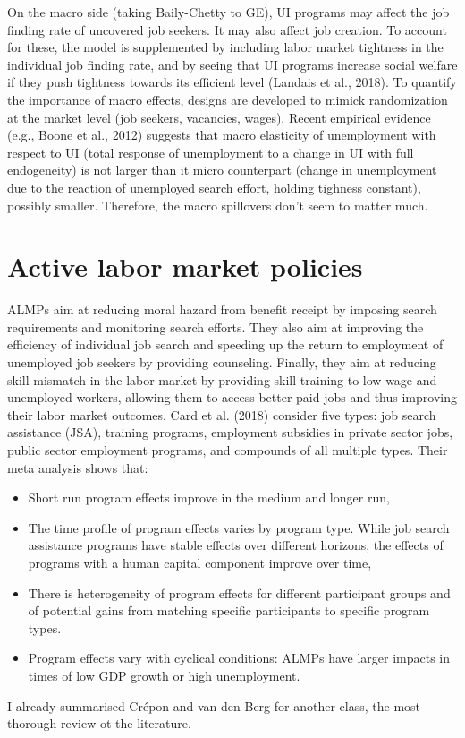 \documentclass{article}
\begin{document}
On the macro side (taking Baily-Chetty to GE), UI programs may affect the job finding rate of uncovered job seekers. It may also affect job creation. To account for these, the model is supplemented by including labor market tightness in the individual job finding rate, and by seeing that UI programs increase social welfare if they push tightness towards its efficient level (Landais et al., 2018). To quantify the importance of macro effects, designs are developed to mimick randomization at the market level (job seekers, vacancies, wages). Recent empirical evidence (e.g., Boone et al., 2012) suggests that macro elasticity of unemployment with respect to UI (total response of unemployment to a change in UI with full endogeneity) is not larger than it micro counterpart (change in unemployment due to the reaction of unemployed search effort, holding tighness constant), possibly smaller. Therefore, the macro spillovers don't seem to matter much.

\section{Active labor market policies}

ALMPs aim at reducing moral hazard from benefit
receipt by imposing search requirements and monitoring search efforts. They also aim at improving the efficiency of individual job search and
speeding up the return to employment of unemployed job seekers by providing counseling. Finally, they aim at reducing skill mismatch in the labor
market by providing skill training to low wage and unemployed workers,
allowing them to access better paid jobs and thus improving their labor
market outcomes. Card et al. (2018) consider five types: job search assistance (JSA), training programs, employment subsidies in private sector jobs, public sector employment programs, and compounds of all multiple types. Their meta analysis shows that:
\begin{itemize}
    \item Short run program effects improve in the medium and longer run,
    \item The time profile of program effects varies by program type. While job search assistance programs have stable effects over different horizons, the effects of programs with a human
    capital component improve over time,
    \item There is heterogeneity of program effects for different participant groups and of potential gains from matching specific participants to specific program types.
    \item Program effects vary with cyclical conditions: ALMPs have
    larger impacts in times of low GDP growth or high unemployment.
\end{itemize}
I already summarised Crépon and van den Berg for another class, the most thorough review ot the literature.
\end{document}

